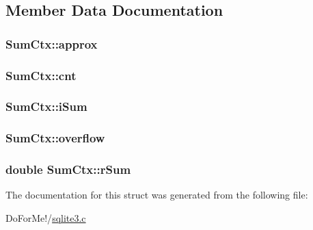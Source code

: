 \subsection{Member Data Documentation}
\hypertarget{struct_sum_ctx_a035a2a22271fee066d9a92d12fe3b9a5}{
\subsubsection[{approx}]{ Sum\-Ctx\-::approx}}\label{struct_sum_ctx_a035a2a22271fee066d9a92d12fe3b9a5}
\hypertarget{struct_sum_ctx_ada00261fe604a7cc6719fdcd8bb5914c}{
\subsubsection[{cnt}]{ Sum\-Ctx\-::cnt}}\label{struct_sum_ctx_ada00261fe604a7cc6719fdcd8bb5914c}
\hypertarget{struct_sum_ctx_ace6196fb30ebc0687997a723d55683db}{
\subsubsection[{i\-Sum}]{ Sum\-Ctx\-::i\-Sum}}\label{struct_sum_ctx_ace6196fb30ebc0687997a723d55683db}
\hypertarget{struct_sum_ctx_a3b14a5da00584aff08314d5e9ddbe9ea}{
\subsubsection[{overflow}]{ Sum\-Ctx\-::overflow}}\label{struct_sum_ctx_a3b14a5da00584aff08314d5e9ddbe9ea}
\hypertarget{struct_sum_ctx_a1774080b9bcada2f4e867eaf40763f41}{
\subsubsection[{r\-Sum}]{\setlength{\rightskip}{0pt plus 5cm}double Sum\-Ctx\-::r\-Sum}}\label{struct_sum_ctx_a1774080b9bcada2f4e867eaf40763f41}


The documentation for this struct was generated from the following file\-:\begin{DoxyCompactItemize}
\item 
Do\-For\-Me!/\hyperlink{sqlite3_8c}{sqlite3.\-c}\end{DoxyCompactItemize}
